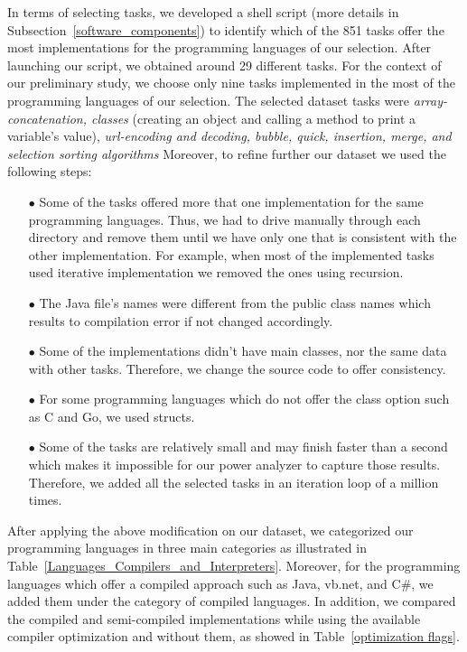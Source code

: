 In terms of selecting tasks, we developed a shell script (more 
details in Subsection~\ref{software_components}) to identify 
which of the 851 tasks offer the most implementations for the 
programming languages of our selection.
After launching our script, we obtained around 29 different tasks. 
For the context of our preliminary study, we choose only 
nine tasks implemented in the most of the programming languages 
of our selection. 
The selected dataset tasks were \textit{array-concatenation, classes} 
(creating an object and calling a method to print a variable's value), 
\textit{url-encoding and decoding, bubble, quick, insertion, merge, 
	and selection sorting algorithms}
Moreover, to refine further our dataset we used the following steps: 

\begin{enumerate}
	\item [$\bullet$] Some of the tasks offered more that one implementation 
	for the same programming languages. 
	Thus, we had to drive manually through each directory and remove 
	them until we have only one that is consistent with the other 
	implementation. 
	For example, when most of the implemented tasks used iterative implementation 
	we removed the ones using recursion. 
	\item [$\bullet$] The Java file's names were 
	different from the public class names which results to compilation 
	error if not changed accordingly. 
	\item [$\bullet$] Some of the implementations didn't have main 
	classes, nor the same data with other tasks. 
	Therefore, we change the source code to offer consistency.
	\item [$\bullet$] For some programming languages which do not offer 
	the class option such as C and Go, we used structs. 
	\item [$\bullet$] Some of the tasks are relatively small and may 
	finish faster than a second which makes it impossible for our 
	power analyzer to capture those results. 
	Therefore, we added all the selected tasks in an iteration loop of 
	a million times. 
\end{enumerate}

After applying the above modification on our dataset, we categorized our 
programming languages in three main categories as illustrated in 
Table~\ref{Languages_Compilers_and_Interpreters}. 
Moreover, for the programming languages which offer a compiled approach 
such as Java, {\sc vb.net}, and C\#, we added them under the category of 
compiled languages. 
In addition, we compared the compiled and semi-compiled implementations while 
using the available compiler optimization and without them, as showed in 
Table~\ref{optimization flags}.



